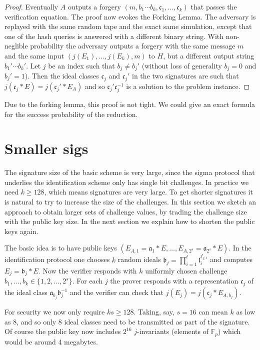 \documentclass{llncs}
\newcommand{\F}{\mathbb{F}}
\renewcommand{\a}{\mathfrak{a}}
\renewcommand{\b}{\mathfrak{b}}
\renewcommand{\c}{\mathfrak{c}}
\renewcommand{\l}{\mathfrak{l}}
\begin{document}
\begin{proof}
Eventually $A$ outputs a forgery $(m, b_1\cdots b_k, \c_1, \dots, \c_k)$ that passes the verification equation.
The proof now evokes the Forking Lemma. The adversary is replayed with the same random tape and the exact same simulation, except that one of the hash queries is answered with a different binary string.
With non-neglible probability the adversary outputs a forgery with the same message $m$ and the same input $(j(E_1), \dots, j(E_k), m)$ to $H$, but a different output string $b_1'\cdots b_k'$. Let $j$ be an index such that $b_j \ne b_j'$ (without loss of generality $b_j = 0$ and $b_j' = 1$). Then the ideal classes $\c_j$ and $\c_j'$ in the two signatures are such that $j( \c_j * E ) = j( \c_j' * E_A )$ and so $\c_j' \c_j^{-1}$ is a solution to the problem instance.
\end{proof}

Due to the forking lemma, this proof is not tight. We could give an exact formula for the success probability of the reduction.



\section{Smaller sigs}


The signature size of the basic scheme is very large, since the sigma protocol that underlies the identification scheme only has single bit challenges. 
In practice we need $k \ge 128$, which means signatures are very large.
To get shorter signatures it is natural to try to increase the size of the challenges.
In this section we sketch an approach to obtain larger sets of challenge values, by trading the challenge size with the public key size. In the next section we explain how to shorten the public keys again.


The basic idea is to have public keys $( E_{A,1} = \a_1 * E , \dots , E_{A,2^s} = \a_{2^s} * E )$.
In the identification protocol one chooses $k$ random ideals $\b_j = \prod_{i=1}^t \l_i^{f_{j,i}}$ and computes $E_j = \b_j * E$.
Now the verifier responds with $k$ uniformly chosen challenge $b_1, \dots, b_k \in \{1, 2, \dots, 2^s \}$.
For each $j$ the prover responds with a representation $\c_j$ of the ideal class $\a_{b_j} \b_j^{-1}$ and the verifier can check that $j( E_j ) = j( \c_j * E_{A, b_j})$.

For security we now only require $ks \ge 128$. Taking, say, $s = 16$ can mean $k$ as low as 8, and so only 8 ideal classes need to be transmitted as part of the signature.
Of course the public key now includes $2^{16}$ $j$-invariants (elements of $\F_p$) which would be around 4 megabytes.
\end{document}
